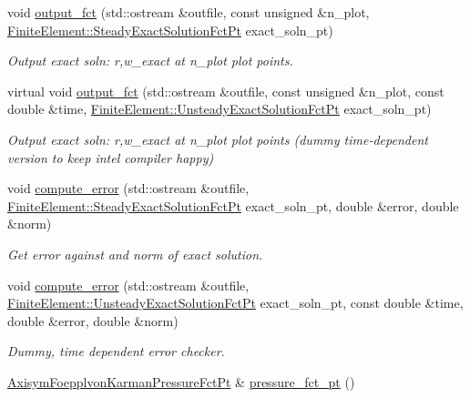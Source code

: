 \begin{DoxyCompactItemize}
void \hyperlink{classoomph_1_1AxisymFoepplvonKarmanEquations_aae7ed0c9ae0e1a1e2656534807a24527}{output\+\_\+fct} (std\+::ostream \&outfile, const unsigned \&n\+\_\+plot, \hyperlink{classoomph_1_1FiniteElement_a690fd33af26cc3e84f39bba6d5a85202}{Finite\+Element\+::\+Steady\+Exact\+Solution\+Fct\+Pt} exact\+\_\+soln\+\_\+pt)
\begin{DoxyCompactList}\small\item\em Output exact soln\+: r,w\+\_\+exact at n\+\_\+plot plot points. \end{DoxyCompactList}\item 
virtual void \hyperlink{classoomph_1_1AxisymFoepplvonKarmanEquations_a14d84273c5e7a3cdec8fb9b228d675c3}{output\+\_\+fct} (std\+::ostream \&outfile, const unsigned \&n\+\_\+plot, const double \&time, \hyperlink{classoomph_1_1FiniteElement_ad4ecf2b61b158a4b4d351a60d23c633e}{Finite\+Element\+::\+Unsteady\+Exact\+Solution\+Fct\+Pt} exact\+\_\+soln\+\_\+pt)
\begin{DoxyCompactList}\small\item\em Output exact soln\+: r,w\+\_\+exact at n\+\_\+plot plot points (dummy time-\/dependent version to keep intel compiler happy) \end{DoxyCompactList}\item 
void \hyperlink{classoomph_1_1AxisymFoepplvonKarmanEquations_abbcf5312db19fdbe66f5dab3bbe9bfda}{compute\+\_\+error} (std\+::ostream \&outfile, \hyperlink{classoomph_1_1FiniteElement_a690fd33af26cc3e84f39bba6d5a85202}{Finite\+Element\+::\+Steady\+Exact\+Solution\+Fct\+Pt} exact\+\_\+soln\+\_\+pt, double \&error, double \&norm)
\begin{DoxyCompactList}\small\item\em Get error against and norm of exact solution. \end{DoxyCompactList}\item 
void \hyperlink{classoomph_1_1AxisymFoepplvonKarmanEquations_a239536a30ed45a68f678037b9bdc7c9b}{compute\+\_\+error} (std\+::ostream \&outfile, \hyperlink{classoomph_1_1FiniteElement_ad4ecf2b61b158a4b4d351a60d23c633e}{Finite\+Element\+::\+Unsteady\+Exact\+Solution\+Fct\+Pt} exact\+\_\+soln\+\_\+pt, const double \&time, double \&error, double \&norm)
\begin{DoxyCompactList}\small\item\em Dummy, time dependent error checker. \end{DoxyCompactList}\item 
\hyperlink{classoomph_1_1AxisymFoepplvonKarmanEquations_a504878b18d793ef8a6540eb0f2b086c8}{Axisym\+Foepplvon\+Karman\+Pressure\+Fct\+Pt} \& \hyperlink{classoomph_1_1AxisymFoepplvonKarmanEquations_a65fd07792735f269b470f4e4cb3c06a2}{pressure\+\_\+fct\+\_\+pt} ()

\end{DoxyCompactItemize}
